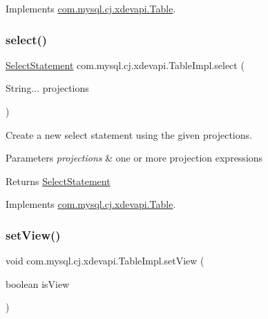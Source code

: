 Implements \mbox{\hyperlink{interfacecom_1_1mysql_1_1cj_1_1xdevapi_1_1_table_a17dc243982bdbd3c0024699d3fb5bd5e}{com.\+mysql.\+cj.\+xdevapi.\+Table}}.

\mbox{\label{classcom_1_1mysql_1_1cj_1_1xdevapi_1_1_table_impl_a048429d90cca804cd60ce9a49f5b12fd}} 
\subsubsection{\texorpdfstring{select()}{select()}}
{\footnotesize\ttfamily \mbox{\hyperlink{interfacecom_1_1mysql_1_1cj_1_1xdevapi_1_1_select_statement}{Select\+Statement}} com.\+mysql.\+cj.\+xdevapi.\+Table\+Impl.\+select (\begin{DoxyParamCaption}\item[{String...}]{projections }\end{DoxyParamCaption})}

Create a new select statement using the given projections.


\begin{DoxyParams}{Parameters}
{\em projections} & one or more projection expressions \\
\hline
\end{DoxyParams}
\begin{DoxyReturn}{Returns}
\mbox{\hyperlink{interfacecom_1_1mysql_1_1cj_1_1xdevapi_1_1_select_statement}{Select\+Statement}} 
\end{DoxyReturn}


Implements \mbox{\hyperlink{interfacecom_1_1mysql_1_1cj_1_1xdevapi_1_1_table_a36559f114d9638a63d8743f1f1630017}{com.\+mysql.\+cj.\+xdevapi.\+Table}}.

\mbox{\label{classcom_1_1mysql_1_1cj_1_1xdevapi_1_1_table_impl_ae3b7e58d7a85393a4d2baf8115acf90c}} 
\subsubsection{\texorpdfstring{set\+View()}{setView()}}
{\footnotesize\ttfamily void com.\+mysql.\+cj.\+xdevapi.\+Table\+Impl.\+set\+View (\begin{DoxyParamCaption}\item[{boolean}]{is\+View }\end{DoxyParamCaption})}

